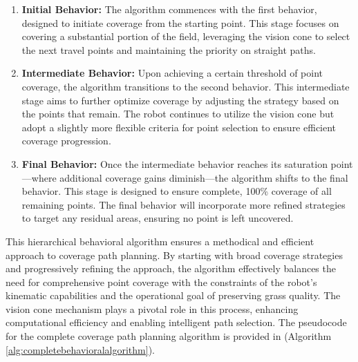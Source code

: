 \begin{enumerate}
    \item \textbf{Initial Behavior: }The algorithm commences with the first behavior, designed to initiate coverage from the starting point. This stage focuses on covering a substantial portion of the field, leveraging the vision cone to select the next travel points and maintaining the priority on straight paths.
    
    \item \textbf{Intermediate Behavior:} Upon achieving a certain threshold of point coverage, the algorithm transitions to the second behavior. This intermediate stage aims to further optimize coverage by adjusting the strategy based on the points that remain. The robot continues to utilize the vision cone but adopt a slightly more flexible criteria for point selection to ensure efficient coverage progression.
    
    \item \textbf{Final Behavior:} Once the intermediate behavior reaches its saturation point—where additional coverage gains diminish—the algorithm shifts to the final behavior. This stage is designed to ensure complete, 100\% coverage of all remaining points. The final behavior will incorporate more refined strategies to target any residual areas, ensuring no point is left uncovered.
\end{enumerate}

\vspace*{6mm}   


This hierarchical behavioral algorithm ensures a methodical and efficient approach to coverage path planning. By starting with broad coverage strategies and progressively refining the approach, the algorithm effectively balances the need for comprehensive point coverage with the constraints of the robot's kinematic capabilities and the operational goal of preserving grass quality. The vision cone mechanism plays a pivotal role in this process, enhancing computational efficiency and enabling intelligent path selection. The pseudocode for the complete coverage path planning algorithm is provided in (Algorithm \autoref{alg:completebehavioralalgorithm}). 

\vspace*{6mm}   

